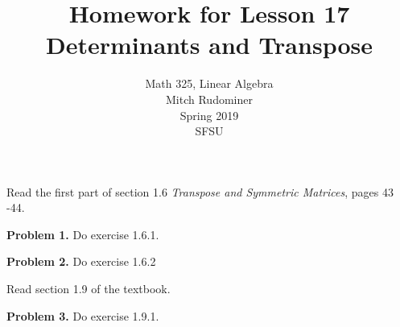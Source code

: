 \documentclass[oneside,12pt]{amsart}
\begin{document}
\title{Homework for Lesson 17 \\ Determinants and Transpose}
\author{Math 325, Linear Algebra \\ Mitch Rudominer \\ Spring 2019 \\ SFSU }
\date{}

\maketitle

\bigskip

Read the first part of section 1.6 \emph{Transpose and Symmetric Matrices}, pages 43 -44.

\bigskip

\textbf{Problem 1.} Do exercise 1.6.1.

\bigskip
\bigskip
\bigskip


\textbf{Problem 2.} Do exercise 1.6.2

\bigskip
\bigskip
\bigskip

Read section 1.9 of the textbook.

\bigskip

\textbf{Problem 3.} Do exercise 1.9.1.
\end{document}
